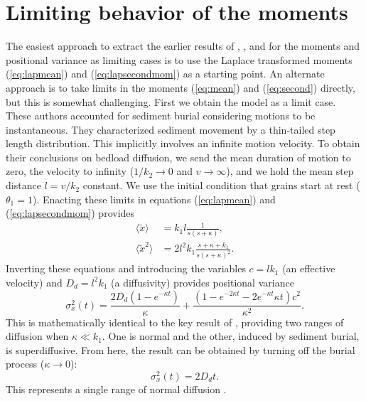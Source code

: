 \documentclass[]{agujournal2018}
\newcommand\be{\begin{equation}}
\newcommand\ee{\end{equation}}
\newcommand\bra{\langle}
\newcommand\ket{\rangle}
\begin{document}
\section{Limiting behavior of the moments}
\label{sec:appendixC}
The easiest approach to extract the earlier results of \cite{Wu2019}, \citet{Lisle1998}, and \citet{Einstein1937} for the moments and positional variance as limiting cases is to use the Laplace transformed moments (\ref{eq:lapmean}) and (\ref{eq:lapsecondmom}) as a starting point.
An alternate approach is to take limits in the moments (\ref{eq:mean}) and (\ref{eq:second}) directly, but this is somewhat challenging.
First we obtain the \citet{Wu2019} model as a limit case. 
These authors accounted for sediment burial considering motions to be instantaneous.
They characterized sediment movement by a thin-tailed step length distribution.
This implicitly involves an infinite motion velocity.
To obtain their conclusions on bedload diffusion, we send the mean duration of motion to zero, the velocity to infinity ($1/k_2\rightarrow 0$ and $v\rightarrow \infty$), and we hold the mean step distance $l = v/k_2$ constant.
We use the initial condition that grains start at rest ($\theta_1=1$).
Enacting these limits in equations (\ref{eq:lapmean}) and (\ref{eq:lapsecondmom}) provides
\begin{align}
\bra \tilde{x} \ket &= k_1l\frac{1}{s(s+\kappa)},\\
\bra \tilde{x}^2 \ket &= 2l^2k_1 \frac{s+\kappa+k_1}{s(s+\kappa)^2}.
\end{align}
Inverting these equations and introducing the variables $c=lk_1$ (an effective velocity) and $D_d = l^2k_1$ (a diffusivity) provides positional variance
\be \sigma_x^2(t) = \frac{2D_d(1-e^{-\kappa t})}{\kappa} + \frac{(1-e^{-2\kappa t}-2e^{-\kappa t}\kappa t)c^2}{\kappa^2}.\ee
This is mathematically identical to the key result of \citet{Wu2019}, providing two ranges of diffusion when $\kappa \ll k_1$. One is normal and the other, induced by sediment burial, is superdiffusive.
From here, the \citet{Einstein1937} result can be obtained by turning off the burial process ($\kappa \rightarrow 0$):
\be \sigma_x^2(t) = 2D_d t.\ee
This represents a single range of normal diffusion \citep[cf.][]{Hubbell1964,Nakagawa1976}.
\end{document}
